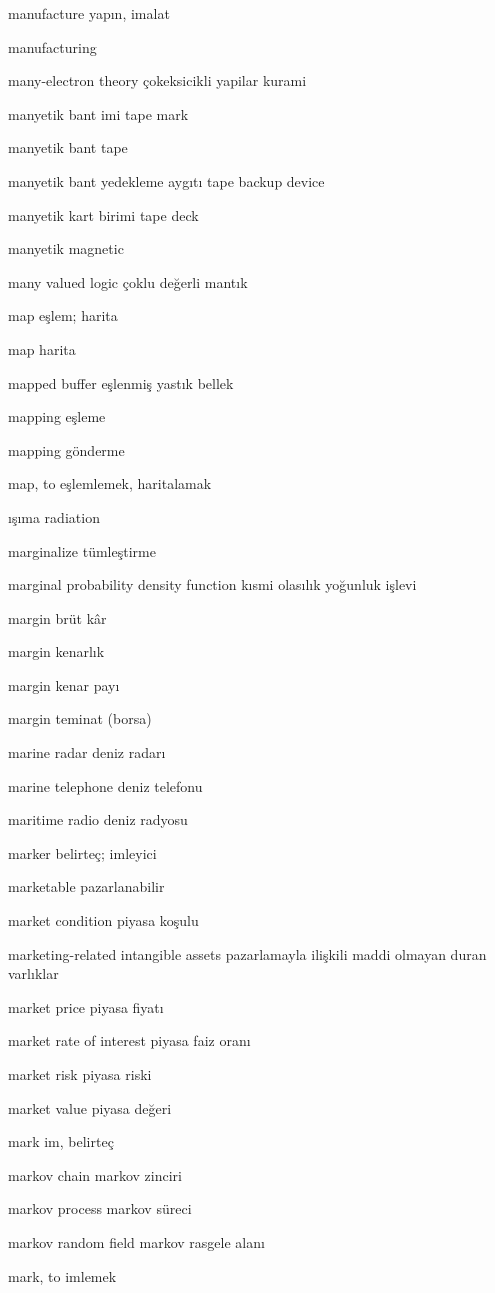 \documentclass[12pt,fleqn]{article}\usepackage{../../common}
\begin{document}
manufacture yapın, imalat

manufacturing

many-electron theory çokeksicikli yapilar kurami

manyetik bant imi tape mark

manyetik bant tape

manyetik bant yedekleme aygıtı tape backup device

manyetik kart birimi tape deck

manyetik magnetic

many valued logic çoklu değerli mantık

map eşlem; harita

map harita

mapped buffer eşlenmiş yastık bellek

mapping eşleme

mapping gönderme

map, to eşlemlemek, haritalamak

ışıma radiation

marginalize tümleştirme

marginal probability density function kısmi olasılık yoğunluk işlevi

margin brüt kâr

margin kenarlık

margin kenar payı

margin teminat (borsa)

marine radar deniz radarı

marine telephone deniz telefonu

maritime radio deniz radyosu

marker belirteç; imleyici

marketable pazarlanabilir

market condition piyasa koşulu

marketing-related intangible assets pazarlamayla ilişkili maddi olmayan duran varlıklar

market price piyasa fiyatı

market rate of interest piyasa faiz oranı

market risk piyasa riski

market value piyasa değeri

mark im, belirteç

markov chain markov zinciri

markov process markov süreci

markov random field markov rasgele alanı

mark, to imlemek
\end{document}
